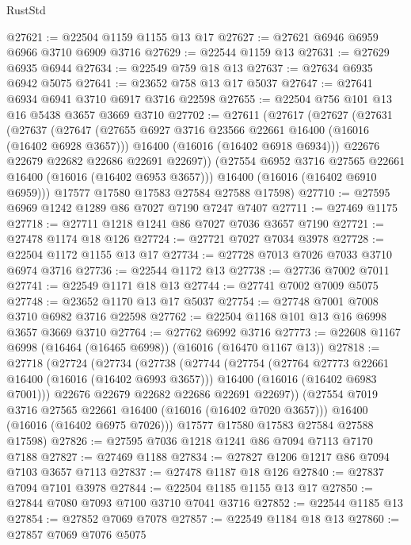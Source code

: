 \begin{lexlean}{RustStd}
\begin{coremodule}
@27621 := @22504 @1159 @1155 @13 @17
@27627 := @27621 @6946 @6959 @6966 @3710 @6909 @3716
@27629 := @22544 @1159 @13
@27631 := @27629 @6935 @6944
@27634 := @22549 @759 @18 @13
@27637 := @27634 @6935 @6942 @5075
@27641 := @23652 @758 @13 @17 @5037
@27647 := @27641 @6934 @6941 @3710 @6917 @3716 @22598
@27655 := @22504 @756 @101 @13 @16 @5438 @3657 @3669 @3710
@27702 := @27611
    (@27617
      (@27627
        (@27631
          (@27637
            (@27647
              (@27655 @6927 @3716 @23566 @22661 @16400 (@16016 (@16402 @6928 @3657)))
              @16400
              (@16016 (@16402 @6918 @6934)))
            @22676
            @22679
            @22682
            @22686
            @22691
            @22697))
        (@27554 @6952 @3716 @27565 @22661 @16400 (@16016 (@16402 @6953 @3657)))
        @16400
        (@16016 (@16402 @6910 @6959)))
      @17577
      @17580
      @17583
      @27584
      @27588
      @17598)
@27710 := @27595 @6969 @1242 @1289 @86 @7027 @7190 @7247 @7407
@27711 := @27469 @1175
@27718 := @27711 @1218 @1241 @86 @7027 @7036 @3657 @7190
@27721 := @27478 @1174 @18 @126
@27724 := @27721 @7027 @7034 @3978
@27728 := @22504 @1172 @1155 @13 @17
@27734 := @27728 @7013 @7026 @7033 @3710 @6974 @3716
@27736 := @22544 @1172 @13
@27738 := @27736 @7002 @7011
@27741 := @22549 @1171 @18 @13
@27744 := @27741 @7002 @7009 @5075
@27748 := @23652 @1170 @13 @17 @5037
@27754 := @27748 @7001 @7008 @3710 @6982 @3716 @22598
@27762 := @22504 @1168 @101 @13 @16 @6998 @3657 @3669 @3710
@27764 := @27762 @6992 @3716
@27773 := @22608 @1167 @6998 (@16464 (@16465 @6998)) (@16016 (@16470 @1167 @13))
@27818 := @27718
    (@27724
      (@27734
        (@27738
          (@27744
            (@27754
              (@27764 @27773 @22661 @16400 (@16016 (@16402 @6993 @3657)))
              @16400
              (@16016 (@16402 @6983 @7001)))
            @22676
            @22679
            @22682
            @22686
            @22691
            @22697))
        (@27554 @7019 @3716 @27565 @22661 @16400 (@16016 (@16402 @7020 @3657)))
        @16400
        (@16016 (@16402 @6975 @7026)))
      @17577
      @17580
      @17583
      @27584
      @27588
      @17598)
@27826 := @27595 @7036 @1218 @1241 @86 @7094 @7113 @7170 @7188
@27827 := @27469 @1188
@27834 := @27827 @1206 @1217 @86 @7094 @7103 @3657 @7113
@27837 := @27478 @1187 @18 @126
@27840 := @27837 @7094 @7101 @3978
@27844 := @22504 @1185 @1155 @13 @17
@27850 := @27844 @7080 @7093 @7100 @3710 @7041 @3716
@27852 := @22544 @1185 @13
@27854 := @27852 @7069 @7078
@27857 := @22549 @1184 @18 @13
@27860 := @27857 @7069 @7076 @5075

\end{coremodule}
\end{lexlean}
